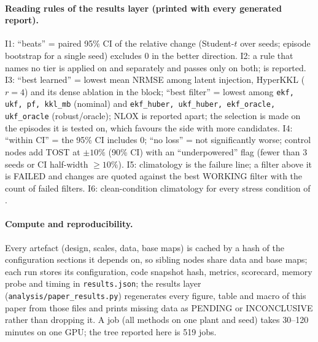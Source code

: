 \paragraph{Reading rules of the results layer (printed with every generated report).} I1: ``beats'' = paired 95\% CI of the relative change (Student-$t$ over seeds; episode bootstrap for a single seed) excludes 0 in the better direction. I2: a rule that names no tier is applied on  and  separately and passes only on both;  is reported. I3: ``best learned'' = lowest mean NRMSE among latent injection, HyperKKL ($r=4$) and its dense ablation in the block; ``best filter'' = lowest among \texttt{ekf, ukf, pf, kkl\_mb} (nominal) and \texttt{ekf\_huber, ukf\_huber, ekf\_oracle, ukf\_oracle} (robust/oracle); NLOX is reported apart; the selection is made on the episodes it is tested on, which favours the side with more candidates. I4: ``within CI'' = the 95\% CI includes 0; ``no loss'' = not significantly worse; control nodes add TOST at $\pm10\%$ (90\% CI) with an ``underpowered'' flag (fewer than 3 seeds or CI half-width $\ge10\%$). I5: climatology is the failure line; a filter above it is FAILED and changes are quoted against the best WORKING filter with the count of failed filters. I6: clean-condition climatology for every stress condition of .

\paragraph{Compute and reproducibility.} Every artefact (design, scales, data, base maps) is cached by a hash of the configuration sections it depends on, so sibling nodes share data and base maps; each run stores its configuration, code snapshot hash, metrics, scorecard, memory probe and timing in \texttt{results.json}; the results layer (\texttt{analysis/paper\_results.py}) regenerates every figure, table and macro of this paper from those files and prints missing data as PENDING or INCONCLUSIVE rather than dropping it. A job (all methods on one plant and seed) takes 30--120 minutes on one GPU; the tree reported here is 519 jobs.
